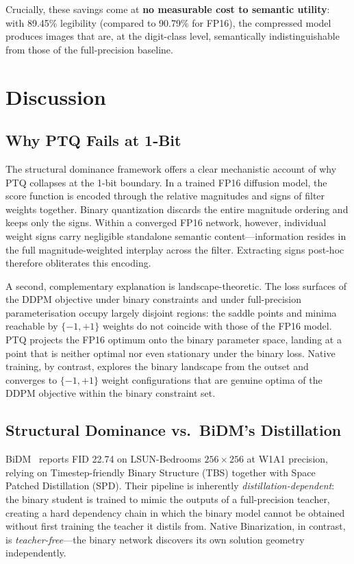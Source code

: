 \documentclass[conference]{IEEEtran}
\begin{document}
Crucially, these savings come at \textbf{no measurable cost to semantic utility}: with
89.45\% legibility (compared to 90.79\% for FP16), the compressed model produces images
that are, at the digit-class level, semantically indistinguishable from those of the
full-precision baseline.

\section{Discussion}

\subsection{Why PTQ Fails at 1-Bit}

The structural dominance framework offers a clear mechanistic account of why PTQ
collapses at the 1-bit boundary. In a trained FP16 diffusion model, the score function
is encoded through the relative magnitudes and signs of filter weights together. Binary
quantization discards the entire magnitude ordering and keeps only the signs. Within a
converged FP16 network, however, individual weight signs carry negligible standalone
semantic content---information resides in the full magnitude-weighted interplay across
the filter. Extracting signs post-hoc therefore obliterates this encoding.

A second, complementary explanation is landscape-theoretic. The loss surfaces of the
DDPM objective under binary constraints and under full-precision parameterisation occupy
largely disjoint regions: the saddle points and minima reachable by $\{-1,+1\}$ weights
do not coincide with those of the FP16 model. PTQ projects the FP16 optimum onto the
binary parameter space, landing at a point that is neither optimal nor even stationary
under the binary loss. Native training, by contrast, explores the binary landscape from
the outset and converges to $\{-1,+1\}$ weight configurations that are genuine optima
of the DDPM objective within the binary constraint set.

\subsection{Structural Dominance vs.\ BiDM's Distillation}

BiDM~\cite{bidm2024} reports FID 22.74 on LSUN-Bedrooms $256{\times}256$ at W1A1
precision, relying on Timestep-friendly Binary Structure (TBS) together with Space
Patched Distillation (SPD). Their pipeline is inherently \emph{distillation-dependent}:
the binary student is trained to mimic the outputs of a full-precision teacher, creating
a hard dependency chain in which the binary model cannot be obtained without first
training the teacher it distils from. Native Binarization, in contrast, is
\emph{teacher-free}---the binary network discovers its own solution geometry
independently.
\end{document}
